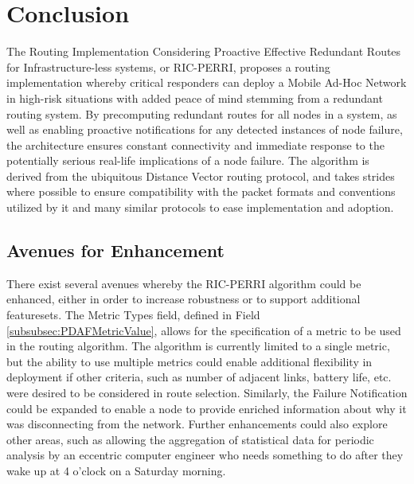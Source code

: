 \section{Conclusion}\label{sec:conclusion}
The Routing Implementation Considering Proactive Effective Redundant Routes for Infrastructure-less systems, or RIC-PERRI, proposes a routing implementation whereby critical responders can deploy a Mobile Ad-Hoc Network in high-risk situations with added peace of mind stemming from a redundant routing system. By precomputing redundant routes for all nodes in a system, as well as enabling proactive notifications for any detected instances of node failure, the architecture ensures constant connectivity and immediate response to the potentially serious real-life implications of a node failure. The algorithm is derived from the ubiquitous Distance Vector routing protocol, and takes strides where possible to ensure compatibility with the packet formats and conventions utilized by it and many similar protocols to ease implementation and adoption.

\subsection{Avenues for Enhancement}
There exist several avenues whereby the RIC-PERRI algorithm could be enhanced, either in order to increase robustness or to support additional featuresets. The Metric Types field, defined in Field \ref{subsubsec:PDAFMetricValue}, allows for the specification of a metric to be used in the routing algorithm. The algorithm is currently limited to a single metric, but the ability to use multiple metrics could enable additional flexibility in deployment if other criteria, such as number of adjacent links, battery life, etc. were desired to be considered in route selection. Similarly, the Failure Notification could be expanded to enable a node to provide enriched information about why it was disconnecting from the network. Further enhancements could also explore other areas, such as allowing the aggregation of statistical data for periodic analysis by an eccentric computer engineer who needs something to do after they wake up at 4 o'clock on a Saturday morning.